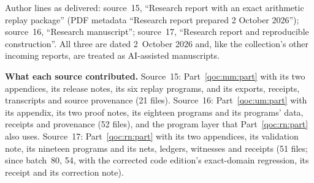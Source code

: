 \documentclass[11pt,letterpaper]{article}
\theoremstyle{definition}
\theoremstyle{remark}
\begin{document}
Author lines as delivered: source~15, ``Research report with an exact arithmetic replay package'' (PDF metadata ``Research report prepared 2 October 2026''); source~16, ``Research manuscript''; source~17, ``Research report and reproducible construction''. All three are dated 2~October 2026 and, like the collection's other incoming reports, are treated as AI-assisted manuscripts.

\textbf{What each source contributed.} Source~15: Part~\ref{qoc:mm:part} with its two appendices, its release notes, its six replay programs, and its exports, receipts, transcripts and source provenance (21 files). Source~16: Part~\ref{qoc:um:part} with its appendix, its two proof notes, its eighteen programs and its programs' data, receipts and provenance (52 files), and the program layer that Part~\ref{qoc:rn:part} also uses. Source~17: Part~\ref{qoc:rn:part} with its two appendices, its validation note, its nineteen programs and its nets, ledgers, witnesses and receipts (51 files; since batch~80, 54, with the corrected code edition's exact-domain regression, its receipt and its correction note).
\end{document}
